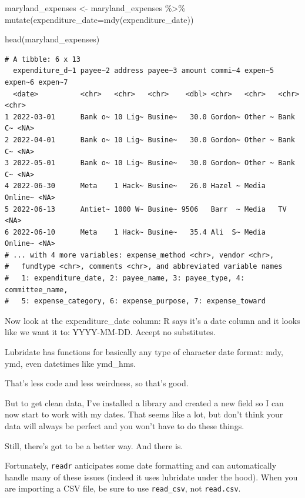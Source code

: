 \documentclass[
  letterpaper,
  DIV=11,
  numbers=noendperiod]{scrreprt}
\newenvironment{Shaded}{\begin{snugshade}}{\end{snugshade}}
\newcommand{\AttributeTok}[1]{\textcolor[rgb]{0.40,0.45,0.13}{#1}}
\newcommand{\FunctionTok}[1]{\textcolor[rgb]{0.28,0.35,0.67}{#1}}
\newcommand{\NormalTok}[1]{\textcolor[rgb]{0.00,0.23,0.31}{#1}}
\newcommand{\OtherTok}[1]{\textcolor[rgb]{0.00,0.23,0.31}{#1}}
\newcommand{\SpecialCharTok}[1]{\textcolor[rgb]{0.37,0.37,0.37}{#1}}
\begin{document}
\begin{Shaded}
\begin{Highlighting}[]
\NormalTok{maryland\_expenses }\OtherTok{\textless{}{-}}\NormalTok{ maryland\_expenses }\SpecialCharTok{\%\textgreater{}\%} \FunctionTok{mutate}\NormalTok{(}\AttributeTok{expenditure\_date=}\FunctionTok{mdy}\NormalTok{(expenditure\_date))}

\FunctionTok{head}\NormalTok{(maryland\_expenses)}
\end{Highlighting}
\end{Shaded}

\begin{verbatim}
# A tibble: 6 x 13
  expenditure_d~1 payee~2 address payee~3 amount commi~4 expen~5 expen~6 expen~7
  <date>          <chr>   <chr>   <chr>    <dbl> <chr>   <chr>   <chr>   <chr>  
1 2022-03-01      Bank o~ 10 Lig~ Busine~   30.0 Gordon~ Other ~ Bank C~ <NA>   
2 2022-04-01      Bank o~ 10 Lig~ Busine~   30.0 Gordon~ Other ~ Bank C~ <NA>   
3 2022-05-01      Bank o~ 10 Lig~ Busine~   30.0 Gordon~ Other ~ Bank C~ <NA>   
4 2022-06-30      Meta    1 Hack~ Busine~   26.0 Hazel ~ Media   Online~ <NA>   
5 2022-06-13      Antiet~ 1000 W~ Busine~ 9506   Barr  ~ Media   TV      <NA>   
6 2022-06-10      Meta    1 Hack~ Busine~   35.4 Ali  S~ Media   Online~ <NA>   
# ... with 4 more variables: expense_method <chr>, vendor <chr>,
#   fundtype <chr>, comments <chr>, and abbreviated variable names
#   1: expenditure_date, 2: payee_name, 3: payee_type, 4: committee_name,
#   5: expense_category, 6: expense_purpose, 7: expense_toward
\end{verbatim}

Now look at the expenditure\_date column: R says it's a date column and
it looks like we want it to: YYYY-MM-DD. Accept no substitutes.

Lubridate has functions for basically any type of character date format:
mdy, ymd, even datetimes like ymd\_hms.

That's less code and less weirdness, so that's good.

But to get clean data, I've installed a library and created a new field
so I can now start to work with my dates. That seems like a lot, but
don't think your data will always be perfect and you won't have to do
these things.

Still, there's got to be a better way. And there is.

Fortunately, \texttt{readr} anticipates some date formatting and can
automatically handle many of these issues (indeed it uses lubridate
under the hood). When you are importing a CSV file, be sure to use
\texttt{read\_csv}, not \texttt{read.csv}.
\end{document}
